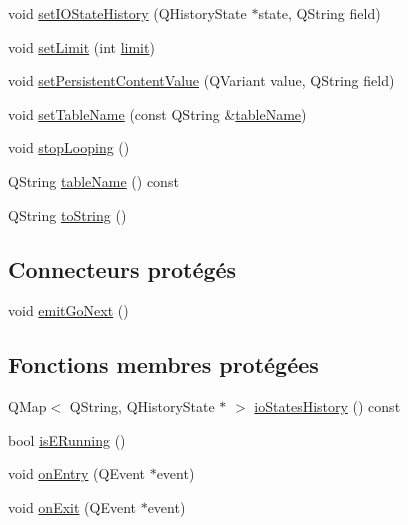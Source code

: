 \begin{DoxyCompactItemize}
\item 
void \hyperlink{classSimpleHotel_1_1SH__InOutStateMachine_a7a6675495f101d29e8eb86df84961795}{set\-I\-O\-State\-History} (Q\-History\-State $\ast$state, Q\-String field)
\item 
void \hyperlink{classSimpleHotel_1_1SH__LoopingInOutStateMachine_a502bc84b055b1cbacf5999dca26bc171}{set\-Limit} (int \hyperlink{classSimpleHotel_1_1SH__LoopingInOutStateMachine_a5039255365e39a63520818168200b686}{limit})
\item 
void \hyperlink{classSimpleHotel_1_1SH__LoopingInOutStateMachine_a688f77a7c6dbbf102cf75234a58b4f97}{set\-Persistent\-Content\-Value} (Q\-Variant value, Q\-String field)
\item 
void \hyperlink{classSimpleHotel_1_1SH__InOutStateMachine_adae23a212e9ba1e590f062994cd367a6}{set\-Table\-Name} (const Q\-String \&\hyperlink{classSimpleHotel_1_1SH__InOutStateMachine_a9fd170fd458e524ac0629b64d5323a45}{table\-Name})
\item 
void \hyperlink{classSimpleHotel_1_1SH__LoopingInOutStateMachine_a64951d436e3f998c7136415019021ec8}{stop\-Looping} ()
\item 
Q\-String \hyperlink{classSimpleHotel_1_1SH__InOutStateMachine_a9fd170fd458e524ac0629b64d5323a45}{table\-Name} () const 
\item 
Q\-String \hyperlink{classSimpleHotel_1_1SH__GenericStateMachine_ad6dd1d0986c40684410ed94f1f610b12}{to\-String} ()
\end{DoxyCompactItemize}
\subsection*{Connecteurs protégés}
\begin{DoxyCompactItemize}
\item 
void \hyperlink{classSimpleHotel_1_1SH__GenericStateMachine_a37846ee6a4cb4d73cf2aff51cb025615}{emit\-Go\-Next} ()
\end{DoxyCompactItemize}
\subsection*{Fonctions membres protégées}
\begin{DoxyCompactItemize}
\item 
Q\-Map$<$ Q\-String, Q\-History\-State $\ast$ $>$ \hyperlink{classSimpleHotel_1_1SH__InOutStateMachine_a0f59a90204a7cbb6835da28cd234978f}{io\-States\-History} () const 
\item 
bool \hyperlink{classSimpleHotel_1_1SH__InOutStateMachine_a6ca4ef874eaaf2446c1a65e6bcbfc46b}{is\-E\-Running} ()
\item 
void \hyperlink{classSimpleHotel_1_1SH__GenericStateMachine_a42c47602883a70ef4965cff373cd5ab6}{on\-Entry} (Q\-Event $\ast$event)
\item 
void \hyperlink{classSimpleHotel_1_1SH__GenericStateMachine_adecc9814338e400f9fce1cc637f1e081}{on\-Exit} (Q\-Event $\ast$event)
\end{DoxyCompactItemize}
